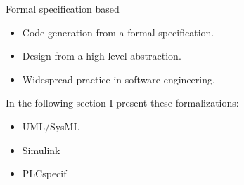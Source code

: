 \documentclass[18pt]{beamer}
\begin{document}
\begin{frame}{Formal specification based}
\begin{itemize}
    \item Code generation from a formal specification.
    \item Design from a high-level abstraction.
    \item Widespread practice in software engineering.
\end{itemize}
In the following section I present these formalizations:
\begin{itemize}
    \item UML/SysML
    \item Simulink
    \item PLCspecif
\end{itemize}
\end{frame}
\end{document}
